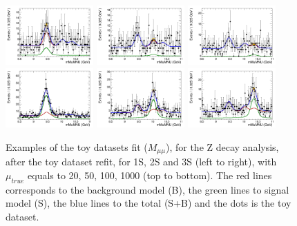 \begin{figure}[!htbp]
\begin{center}
\includegraphics[width=0.3\textwidth]{figures/modeling_xchecks/plots/ZToUpsilon1SPhoton_Cat0_signalStrenght_100/Cat0_mMuMNU_fit_s}
\includegraphics[width=0.3\textwidth]{figures/modeling_xchecks/plots/ZToUpsilon2SPhoton_Cat0_signalStrenght_100/Cat0_mMuMNU_fit_s}
\includegraphics[width=0.3\textwidth]{figures/modeling_xchecks/plots/ZToUpsilon3SPhoton_Cat0_signalStrenght_100/Cat0_mMuMNU_fit_s}
\includegraphics[width=0.3\textwidth]{figures/modeling_xchecks/plots/ZToUpsilon1SPhoton_Cat0_signalStrenght_1000/Cat0_mMuMNU_fit_s}
\includegraphics[width=0.3\textwidth]{figures/modeling_xchecks/plots/ZToUpsilon2SPhoton_Cat0_signalStrenght_1000/Cat0_mMuMNU_fit_s}
\includegraphics[width=0.3\textwidth]{figures/modeling_xchecks/plots/ZToUpsilon3SPhoton_Cat0_signalStrenght_1000/Cat0_mMuMNU_fit_s}
\end{center}
\caption{Examples of the toy datasets fit ($M_{\mu\mu}$), for the Z decay analysis, after the toy dataset refit, for 1S, 2S and 3S (left to right), with $\mu_{true}$ equals to 20, 50, 100, 1000 (top to bottom). The red lines corresponds to the background model (B), the green lines to signal model (S), the blue lines to the total (S+B) and the dots is the toy dataset.}
\label{fig:fits_xchecks_mMuMNU_Z}
\end{figure}



